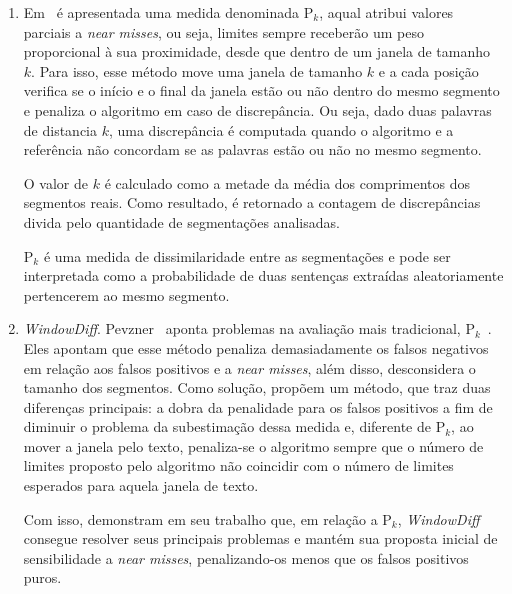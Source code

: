 \begin{enumerate}

	\item Em~\cite{Beeferman1999} é apresentada uma medida denominada P$_k$, aqual atribui valores parciais a \textit{near misses}, ou seja, limites sempre receberão um peso proporcional à sua proximidade, desde que dentro de um janela de tamanho~$k$.
%
Para isso, esse método move uma janela de tamanho $k$ e a cada posição verifica se o início e o final da janela estão ou não dentro do mesmo segmento e penaliza o algoritmo em caso de discrepância. Ou seja, dado duas palavras de distancia $k$, uma discrepância é computada quando o algoritmo e a referência não concordam se as palavras estão ou não no mesmo segmento.

O valor de $k$ é calculado como a metade da média dos comprimentos dos segmentos reais. Como resultado, é retornado a contagem de discrepâncias divida pelo quantidade de segmentações analisadas. 

P$_k$ é uma medida de dissimilaridade entre as segmentações e pode ser interpretada como a probabilidade de duas sentenças extraídas aleatoriamente pertencerem ao mesmo segmento.

\item \textit{WindowDiff}. Pevzner~\cite{Pevzner2002} aponta problemas na avaliação mais tradicional, P$_k$~\cite{Beeferman1999}. Eles apontam que esse método penaliza demasiadamente os falsos negativos em relação aos falsos positivos e a \textit{near misses}, além disso, desconsidera o tamanho dos segmentos. Como solução, propõem um método, que traz duas diferenças principais: a dobra da penalidade para os falsos positivos a fim de diminuir o problema da subestimação dessa medida e, diferente de P$_k$, ao mover a janela pelo texto, penaliza-se o algoritmo sempre que o número de limites proposto pelo algoritmo não coincidir com o número de limites esperados para aquela janela de texto. 

Com isso, demonstram em seu trabalho que, em relação a P$_k$, \textit{WindowDiff} consegue resolver seus principais problemas e mantém sua proposta inicial de sensibilidade a \textit{near misses}, penalizando-os menos que os falsos positivos puros.


\end{enumerate}














